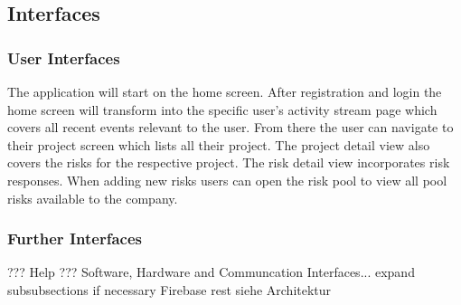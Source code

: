 \subsection{Interfaces}
\label{sec:domainBe}

\subsubsection{User Interfaces}
\label{sec:domainBea}
The application will start on the home screen. After registration and login the home screen will transform into the specific user's activity stream page which covers all recent events relevant to the user. From there the user can navigate to their project screen which lists all their project. The project detail view also covers the risks for the respective project. The risk detail view incorporates risk responses.
When adding new risks users can open the risk pool to view all pool risks available to the company.
\subsubsection{Further Interfaces}
\label{sec:domainBeb}
??? Help ???
Software, Hardware and Communcation Interfaces... expand subsubsections if necessary
Firebase rest siehe Architektur
